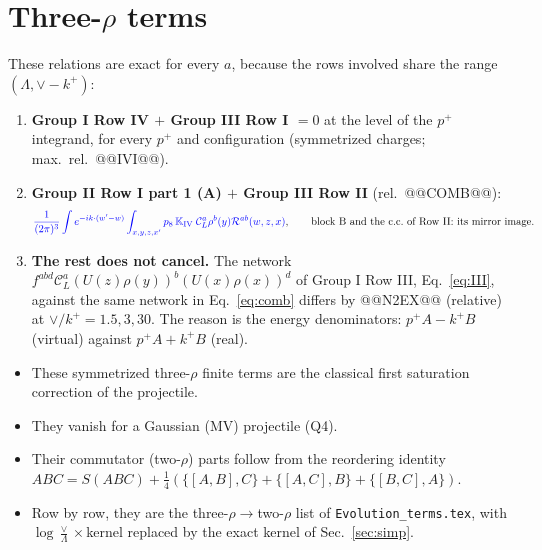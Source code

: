 \documentclass[10pt]{article}
\numberwithin{equation}{section}
\newcommand{\new}[1]{{\color{blue}#1}}
\newcommand{\CL}{\mathcal C_L}
\newcommand{\Rc}{\mathcal R}
\newcommand{\pre}{\frac{1}{(2\pi)^3}}
\newcommand{\phw}{e^{-ik\cdot(w'-w)}}
\begin{document}
\section{Three-\texorpdfstring{$\rho$}{rho} terms}\label{sec:three}
These relations are exact for every $a$, because the rows involved share the range $(\Lambda,\vee-k^+)$:
\begin{enumerate}
\item \textbf{Group I Row IV $+$ Group III Row I $=0$} at the level of the $p^+$ integrand, for every $p^+$ and configuration (symmetrized charges; max.\ rel.\ @@IVI@@).
\item \textbf{Group II Row I part 1 (A) $+$ Group III Row II} (rel.\ @@COMB@@):
\begin{equation}
\new{\pre\int\phw\int_{x,y,z,x'}p_8\,\mathbb K_{\rm IV}\;\CL^a\rho^b(y)\Rc^{ab}(w,z,x)},\qquad\text{block B and the c.c.\ of Row II: its mirror image.}
\label{eq:comb}
\end{equation}
\item \textbf{The rest does not cancel.} The network $f^{abd}\CL^a(U(z)\rho(y))^b(U(x)\rho(x))^d$ of Group I Row III, Eq.~\eqref{eq:III}, against the same network in Eq.~\eqref{eq:comb} differs by @@N2EX@@ (relative) at $\vee/k^+=1.5,3,30$. The reason is the energy denominators: $p^+A-k^+B$ (virtual) against $p^+A+k^+B$ (real).
\end{enumerate}
\begin{itemize}
\item These symmetrized three-$\rho$ finite terms are the classical first saturation correction of the projectile.
\item They vanish for a Gaussian (MV) projectile (Q4).
\item Their commutator (two-$\rho$) parts follow from the reordering identity $ABC=S(ABC)+\frac14(\{[A,B],C\}+\{[A,C],B\}+\{[B,C],A\})$.
\item Row by row, they are the three-$\rho\to$two-$\rho$ list of \texttt{Evolution\_terms.tex}, with $\log\frac\vee\Lambda\times$kernel replaced by the exact kernel of Sec.~\ref{sec:simp}.
\end{itemize}

\end{document}

